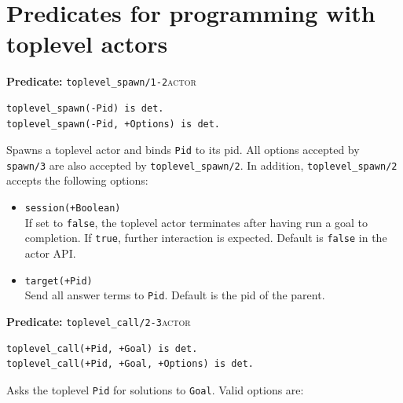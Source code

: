 \section{Predicates for programming with toplevel actors}\label{sec:toplevel-api}

\noindent \textbf{Predicate:} \texttt{toplevel\_spawn/1-2}\hfill\textsc{actor}

\begin{verbatim}
toplevel_spawn(-Pid) is det.
toplevel_spawn(-Pid, +Options) is det.
\end{verbatim}

\noindent Spawns a toplevel actor and binds \texttt{Pid} to its pid. All options accepted by \texttt{spawn/3} are also accepted by
\texttt{toplevel\_spawn/2}. In addition, \texttt{toplevel\_spawn/2}
accepts the following options:

\begin{itemize}
\item
  \texttt{session(+Boolean)}\\
  If set to \texttt{false}, the toplevel actor terminates after having run a
  goal to completion. If \texttt{true}, further interaction is expected.
  Default is \texttt{false} in the actor API.
\item
  \texttt{target(+Pid)}\\
  Send all answer terms to \texttt{Pid}. Default is the pid of the parent.
\end{itemize}

\noindent \textbf{Predicate:} \texttt{toplevel\_call/2-3}\hfill\textsc{actor}

\begin{verbatim}
toplevel_call(+Pid, +Goal) is det.
toplevel_call(+Pid, +Goal, +Options) is det.
\end{verbatim}

\noindent Asks the toplevel \texttt{Pid} for solutions to \texttt{Goal}. Valid
options are:

